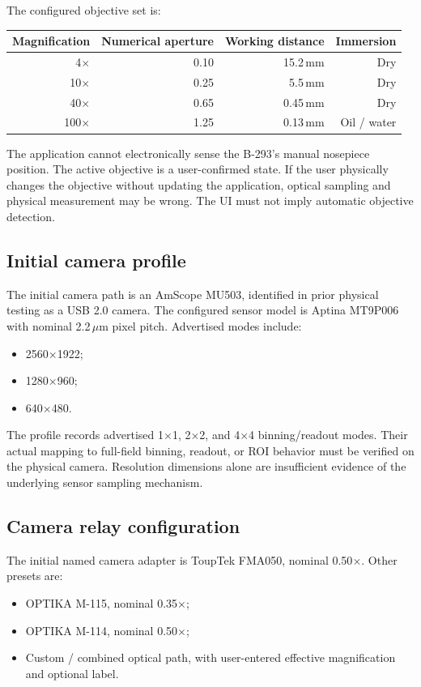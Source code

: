 \documentclass[11pt,a4paper,oneside]{article}
\begin{document}
The configured objective set is:
\begin{center}
\begin{tabular}{rrrr}
\toprule
Magnification & Numerical aperture & Working distance & Immersion\\
\midrule
4$\times$ & 0.10 & 15.2\,mm & Dry\\
10$\times$ & 0.25 & 5.5\,mm & Dry\\
40$\times$ & 0.65 & 0.45\,mm & Dry\\
100$\times$ & 1.25 & 0.13\,mm & Oil / water\\
\bottomrule
\end{tabular}
\end{center}

The application cannot electronically sense the B-293's manual nosepiece position. The active objective is a user-confirmed state. If the user physically changes the objective without updating the application, optical sampling and physical measurement may be wrong. The UI must not imply automatic objective detection.

\subsection{Initial camera profile}
The initial camera path is an AmScope MU503, identified in prior physical testing as a USB 2.0 camera. The configured sensor model is Aptina MT9P006 with nominal 2.2\,$\mu$m pixel pitch. Advertised modes include:
\begin{itemize}
  \item 2560$\times$1922;
  \item 1280$\times$960;
  \item 640$\times$480.
\end{itemize}
The profile records advertised 1$\times$1, 2$\times$2, and 4$\times$4 binning/readout modes. Their actual mapping to full-field binning, readout, or ROI behavior must be verified on the physical camera. Resolution dimensions alone are insufficient evidence of the underlying sensor sampling mechanism.

\subsection{Camera relay configuration}
The initial named camera adapter is ToupTek FMA050, nominal 0.50$\times$. Other presets are:
\begin{itemize}
  \item OPTIKA M-115, nominal 0.35$\times$;
  \item OPTIKA M-114, nominal 0.50$\times$;
  \item Custom / combined optical path, with user-entered effective magnification and optional label.
\end{itemize}
\end{document}
